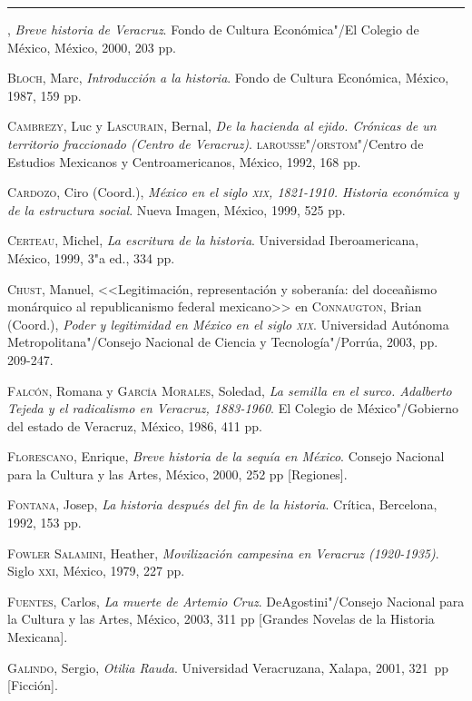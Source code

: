 \documentclass[14pt,twoside,final]{extbook} %
\begin{document}
\rule{1cm}{0.4pt}, \emph{Breve historia de Veracruz}. Fondo de Cultura Económica"/El Colegio de México, México, 2000, 203 pp.

\textsc{Bloch}, Marc, \emph{Introducción a la historia}. Fondo de Cultura Económica, México, 1987, 159 pp.

\textsc{Cambrezy}, Luc y \textsc{Lascurain}, Bernal, \emph{De la hacienda al ejido. Crónicas de un territorio fraccionado (Centro de Veracruz)}. \textsc{larousse"/orstom}"/Centro de Estudios Mexicanos y Centroamericanos, México, 1992, 168 pp.

\textsc{Cardozo}, Ciro (Coord.), \emph{México en el siglo \textsc{xix}, 1821-1910. Historia económica y de la estructura social}. Nueva Imagen, México, 1999, 525 pp.

\textsc{Certeau}, Michel, \emph{La escritura de la historia}. Universidad Iberoamericana, México, 1999, 3"a ed., 334 pp.

\textsc{Chust}, Manuel, <<Legitimación, representación y soberanía: del doceañismo
monárquico al republicanismo federal mexicano>> en \textsc{Connaugton}, Brian (Coord.), \emph{Poder y legitimidad en México en el siglo \textsc{xix}}. Universidad Autónoma Metropolitana"/Consejo Nacional de Ciencia y Tecnología"/Porrúa, 2003, pp. 209-247.

\textsc{Falcón}, Romana y \textsc{García Morales}, Soledad, \emph{La semilla en el surco. Adalberto Tejeda y el radicalismo en Veracruz, 1883-1960}. El Colegio de México"/Gobierno del
estado de Veracruz, México, 1986, 411 pp.

\textsc{Florescano}, Enrique, \emph{Breve historia de la sequía en México}. Consejo Nacional para la Cultura y las Artes, México, 2000, 252 pp [Regiones].

\textsc{Fontana}, Josep, \emph{La historia después del fin de la historia}. Crítica, Bercelona, 1992, 153 pp.

\textsc{Fowler Salamini}, Heather, \emph{Movilización campesina en Veracruz (1920-1935)}. Siglo \textsc{xxi}, México, 1979, 227 pp.

\textsc{Fuentes}, Carlos, \emph{La muerte de Artemio Cruz}. DeAgostini"/Consejo Nacional para la Cultura y las Artes, México, 2003, 311 pp [Grandes Novelas de la Historia Mexicana].

\textsc{Galindo}, Sergio, \emph{Otilia Rauda}. Universidad Veracruzana, Xalapa, 2001, 321~pp [Ficción].
\end{document}
